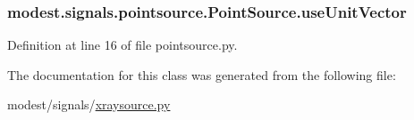 \subsubsection[{\texorpdfstring{use\+Unit\+Vector}{useUnitVector}}]{\setlength{\rightskip}{0pt plus 5cm}modest.\+signals.\+pointsource.\+Point\+Source.\+use\+Unit\+Vector\hspace{0.3cm}{\ttfamily [inherited]}}\hypertarget{classmodest_1_1signals_1_1pointsource_1_1PointSource_ac2dd52c4e1f7e6264c9d59a5ffbc43d1}{}\label{classmodest_1_1signals_1_1pointsource_1_1PointSource_ac2dd52c4e1f7e6264c9d59a5ffbc43d1}


Definition at line 16 of file pointsource.\+py.



The documentation for this class was generated from the following file\+:\begin{DoxyCompactItemize}
\item 
modest/signals/\hyperlink{xraysource_8py}{xraysource.\+py}\end{DoxyCompactItemize}
